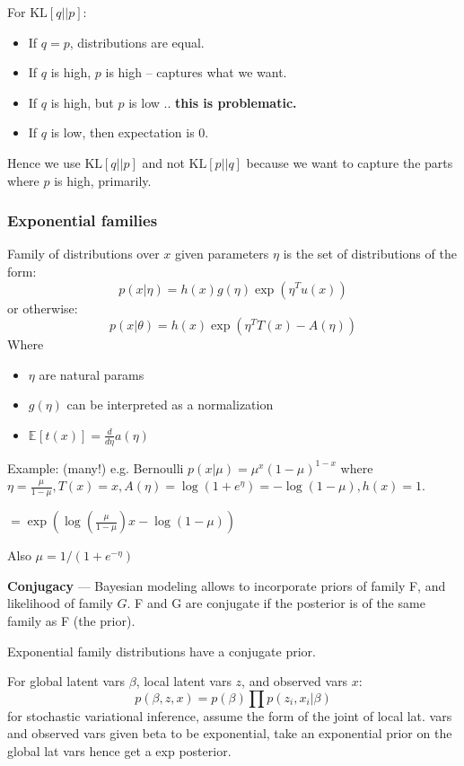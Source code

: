 \documentclass{article}
\newcommand{\E}[2]{\mathbb{E}_{#1}\left[#2\right]}
\newcommand{\KL}[2]{\mathrm{KL}\left[#1||#2\right]}
\begin{document}
For $\KL{q}{p}$:
\begin{itemize}
    \item If $q = p$, distributions are equal.
    \item If $q$ is high, $p$ is high -- captures what we want.
    \item If $q$ is high, but $p$ is low .. \textbf{this is problematic.}
    \item If $q$ is low, then expectation is 0.
\end{itemize}

Hence we use $\KL{q}{p}$ and not $\KL{p}{q}$ because we want to capture the parts where $p$ is high, primarily.

\subsubsection{Exponential families}

Family of distributions over $x$ given parameters $\eta$ is the set of distributions of the form:
$$p(x|\eta) = h(x)g(\eta)\exp(\eta^Tu(x))$$
or otherwise:
$$p(x|\theta) = h(x) \exp(\eta^T T(x) - A(\eta))$$
Where
\begin{itemize}
    \item $\eta$ are natural params
    \item $g(\eta)$ can be interpreted as a normalization
    \item $\E{}{t(x)} = \frac{d}{d\eta}a(\eta)$
\end{itemize}

Example: (many!) e.g. Bernoulli $p(x|\mu) = \mu^x (1-\mu)^{1-x}$ 
where $\eta = \frac{\mu}{1-\mu}, T(x) = x, A(\eta) = \log(1+e^\eta) = -\log(1-\mu), h(x) = 1$.

$= \exp\left(\log\left(\frac{\mu}{1-\mu}\right)x - \log(1-\mu)\right)$

Also $\mu = 1 / (1+e^{-\eta})$

\textbf{Conjugacy} --- Bayesian modeling allows to incorporate priors of family F, and likelihood of family $G$. F and G are conjugate if the posterior is of the same family as F (the prior).

Exponential family distributions have a conjugate prior.

For global latent vars $\beta$, local latent vars $z$, and observed vars $x$:
$$p(\beta, z, x) = p(\beta) \prod p(z_i, x_i | \beta)$$
for stochastic variational inference, assume the form of the joint of local lat. vars and observed vars given beta to be exponential, take an exponential prior on the global lat vars hence get a exp posterior.
\end{document}
